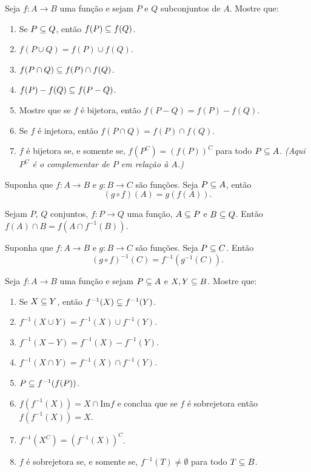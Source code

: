 \documentclass[12pt]{exam}
\begin{document}
\questao{} Seja $f : A \to B$ uma função e sejam $P$ e $Q$ subconjuntos de $A$. Mostre que:
\begin{enumerate}[label={\alph*})]
    \item Se $P\subseteq Q$, então $f(P)\subseteq f(Q)$.
    \item $f(P\cup Q) = f(P)\cup f(Q)$.

    \item $f(P\cap Q)\subseteq f(P)\cap f(Q)$.

    \item $f(P) - f(Q) \subseteq f(P - Q)$.

    \item Mostre que se $f$ é bijetora, então $f(P - Q) = f(P) - f(Q)$.

    \item Se $f$ é injetora, então $f(P\cap Q) =  f(P)\cap f(Q)$.

    \item $f$ é bijetora se, e somente se, $f(P^C) = (f(P))^C$ para todo $P \subseteq A$. \textit{(Aqui $P^C$ é o complementar de $P$ em relação \`a $A$.)}
\end{enumerate}

\vspace{.3cm}

\questao{} Suponha que $f : A \to B$ e $g : B \to C$ são funções. Seja $P \subseteq A$, então
\[
(g \circ f)(A) = g(f(A)).
\]

\vspace{.3cm}

\questao{} Sejam $P$, $Q$ conjuntos, $f : P \to Q$ uma função, $A \subseteq P$ e $B \subseteq Q$. Então $f(A) \cap B = f(A \cap f^{-1}(B))$.

\vspace{.3cm}

\questao{} Suponha que $f : A \to B$ e $g : B \to C$ são funções. Seja $P \subseteq C$. Então
\[
(g \circ f)^{-1}(C) = f^{-1}(g^{-1}(C)).
\]

\questao{} Seja $f : A \to B$ uma função e sejam $P \subseteq
A$ e $X, Y\subseteq B$. Mostre que:
\begin{enumerate}[label={\alph*})]
    \item Se $X\subseteq Y$, então $f^{-1}(X)\subseteq f^{-1}(Y)$.

    \item $f^{-1}(X\cup Y)=f^{-1}(X)\cup f^{-1}(Y)$.

    \item $f^{-1}(X - Y) = f^{-1}(X) - f^{-1}(Y)$.

    \item $f^{-1}(X\cap Y)= f^{-1}(X)\cap f^{-1}(Y)$.

    \item $P\subseteq f^{-1}(f(P))$.

    \item $f(f^{-1}(X))= X \cap \mbox{Im}f$ e conclua que se $f$ é sobrejetora então
    $f(f^{-1}(X))=X$.
    \item $f^{-1}(X^C) = (f^{-1}(X))^C$.

    \item $f$ é sobrejetora se, e somente se, $f^{-1}(T) \ne \emptyset$ para todo $T \subseteq B$.
\end{enumerate}
\end{document}
